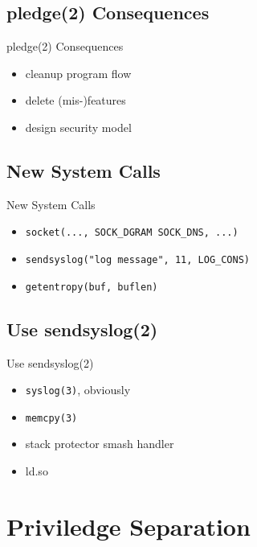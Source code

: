 \documentclass[14pt]{beamer}
\begin{document}
\subsection{pledge(2) Consequences}
\begin{frame}{pledge(2) Consequences}
\begin{itemize}
    \item cleanup program flow
    \item delete (mis-)features
    \item design security model
\end{itemize}
\end{frame}

\subsection{New System Calls}
\begin{frame}{New System Calls}
\begin{itemize}
    \item \texttt{socket(..., SOCK\_DGRAM \textpipe{} SOCK\_DNS, ...) }
    \item \texttt{sendsyslog("log message", 11, LOG\_CONS) }
    \item \texttt{getentropy(buf, buflen) }
\end{itemize}
\end{frame}

\subsection{Use sendsyslog(2)}
\begin{frame}{Use sendsyslog(2)}
\begin{itemize}
    \item \texttt{syslog(3)}, obviously
    \item \texttt{memcpy(3)}
    \item stack protector smash handler
    \item ld.so
\end{itemize}
\end{frame}

\section{Priviledge Separation}
\end{document}

